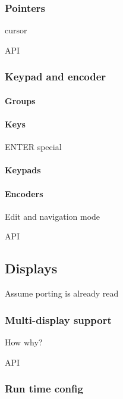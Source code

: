 \documentclass[letterpaper,10pt,english]{sphinxmanual}
\begin{document}
\subsubsection{Pointers}
\label{\detokenize{overview/indev:pointers}}
cursor

API


\subsubsection{Keypad and encoder}
\label{\detokenize{overview/indev:keypad-and-encoder}}

\paragraph{Groups}
\label{\detokenize{overview/indev:groups}}

\paragraph{Keys}
\label{\detokenize{overview/indev:keys}}
ENTER special


\paragraph{Keypads}
\label{\detokenize{overview/indev:keypads}}

\paragraph{Encoders}
\label{\detokenize{overview/indev:encoders}}
Edit and navigation mode

API


\subsection{Displays}
\label{\detokenize{overview/display:displays}}\label{\detokenize{overview/display::doc}}
Assume porting is already read


\subsubsection{Multi-display support}
\label{\detokenize{overview/display:multi-display-support}}
How why?

API


\subsubsection{Run time config}
\label{\detokenize{overview/display:run-time-config}}
\end{document}
